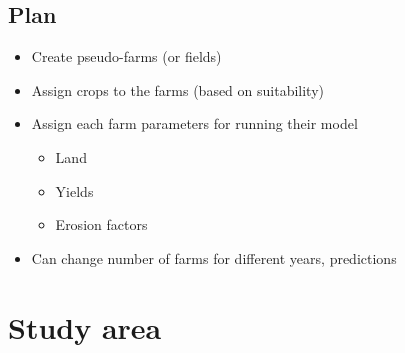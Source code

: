 \documentclass{elsart}
\begin{document}
\subsection{Plan}
  \begin{itemize}
  \item Create pseudo-farms (or fields)
  \item Assign crops to the farms (based on suitability)
  \item Assign each farm parameters for running their model
    \begin{itemize}
    \item Land 
    \item Yields
    \item Erosion factors
    \end{itemize}
  \item Can change number of farms for different years, predictions
  \end{itemize}


\section{Study area}

\end{document}
